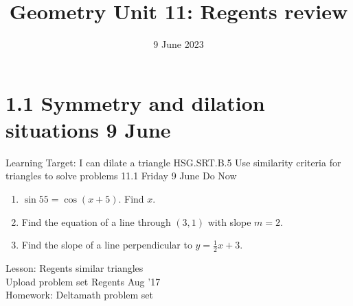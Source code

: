 \documentclass[onlytextwidth, aspectratio=169]{beamer}
\title{Geometry Unit 11: Regents review}
\date{9 June 2023}
\begin{document}
\frame{\titlepage}
\section[Outline]{}
\frame{\tableofcontents}

\section{1.1 Symmetry and dilation situations \hfill 9 June \,}
\begin{frame}{Learning Target: I can dilate a triangle}
  {HSG.SRT.B.5 Use similarity criteria for triangles to solve problems \hfill \alert{11.1 Friday 9 June}}
    Do Now
    \begin{enumerate}
      \item $\sin 55 = \cos (x+5)$. Find $x$.
      \item Find the equation of a line through $(3,1)$ with slope $m=2$.
      \item Find the slope of a line perpendicular to $y=\frac{1}{2}x+3$.
    \end{enumerate} \vspace{1cm}
    Lesson: Regents similar triangles \\
    Upload problem set Regents Aug '17\\[0.5cm]
    Homework: Deltamath problem set
\end{frame}
\end{document}

